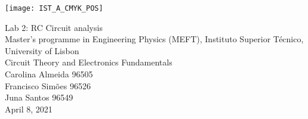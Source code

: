 
\thispagestyle {empty}

\texttt{[image: IST\_A\_CMYK\_POS]}

\begin{center}
%
\vspace{1.0cm}

\vspace{1cm}
{\FontLb Lab 2: RC Circuit analysis} \\ %
\vspace{1cm}
{\FontSn Master’s programme in Engineering Physics (MEFT), Instituto Superior Técnico, University of Lisbon} \\ %
\vspace{0.6cm}
{\FontSn Circuit Theory and Electronics Fundamentals} \\
\vspace{0.6cm}
{\FontSn Carolina Almeida 96505 \\ Francisco Simões 96526 \\ Juna Santos 96549} \\
\vspace{1cm}
{\FontSn April 8, 2021} \\ %
%
\end{center}

